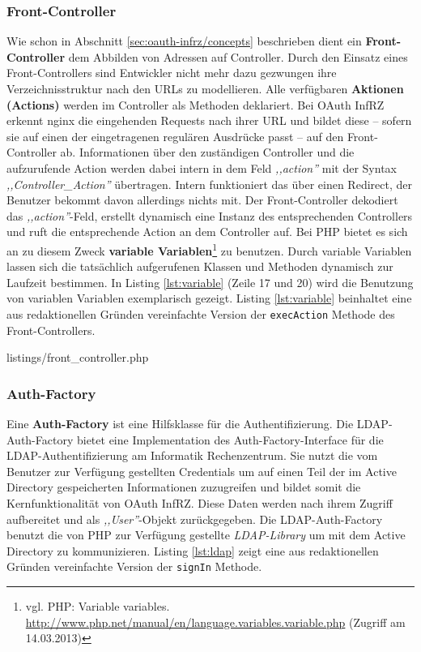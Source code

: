 \documentclass[12pt,a4paper,pointednumbers,abstracton]{scrartcl}
\newcommand{\code}[1]{\small\lstinline[style=InlinePHP]!#1!\normalsize}
\begin{document}
\subsubsection{Front-Controller}

Wie schon in Abschnitt \ref{sec:oauth-infrz/concepts} beschrieben dient ein \textbf{Front-Controller} dem Abbilden von Adressen auf Controller.
Durch den Einsatz eines Front-Controllers sind Entwickler nicht mehr dazu gezwungen ihre Verzeichnisstruktur nach den URLs zu modellieren.
Alle verfügbaren \textbf{Aktionen (Actions)} werden im Controller als Methoden deklariert.
Bei OAuth InfRZ erkennt nginx die eingehenden Requests nach ihrer URL und bildet diese -- sofern sie auf einen der eingetragenen regulären Ausdrücke passt -- auf den Front-Controller ab.
Informationen über den zuständigen Controller und die aufzurufende Action werden dabei intern in dem Feld \emph{,,action''} mit der Syntax \emph{,,Controller\_Action''} übertragen.
Intern funktioniert das über einen Redirect, der Benutzer bekommt davon allerdings nichts mit.
Der Front-Controller dekodiert das \emph{,,action''}-Feld, erstellt dynamisch eine Instanz des entsprechenden Controllers und ruft die entsprechende Action an dem Controller auf.
Bei PHP bietet es sich an zu diesem Zweck \textbf{variable Variablen}\footnote{vgl. PHP: Variable variables. \url{http://www.php.net/manual/en/language.variables.variable.php} (Zugriff am 14.03.2013)} zu benutzen.
Durch variable Variablen lassen sich die tatsächlich aufgerufenen Klassen und Methoden dynamisch zur Laufzeit bestimmen.
In Listing \ref{lst:variable} (Zeile 17 und 20) wird die Benutzung von variablen Variablen exemplarisch gezeigt.
Listing \ref{lst:variable} beinhaltet eine aus redaktionellen Gründen vereinfachte Version der \code{execAction} Methode des Front-Controllers.

\begin{minipage}{\textwidth}
	
	{listings/front_controller.php}
\end{minipage}

\subsubsection{Auth-Factory}

Eine \textbf{Auth-Factory} ist eine Hilfsklasse für die Authentifizierung.
Die LDAP-Auth-Factory bietet eine Implementation des Auth-Factory-Interface für die LDAP-Authentifizierung am Informatik Rechenzentrum.
Sie nutzt die vom Benutzer zur Verfügung gestellten Credentials um auf einen Teil der im Active Directory gespeicherten Informationen zuzugreifen und bildet somit die Kernfunktionalität von OAuth InfRZ.
Diese Daten werden nach ihrem Zugriff aufbereitet und als \emph{,,User''}-Objekt zurückgegeben.
Die LDAP-Auth-Factory benutzt die von PHP zur Verfügung gestellte \emph{LDAP-Library} um mit dem Active Directory zu kommunizieren.
Listing \ref{lst:ldap} zeigt eine aus redaktionellen Gründen vereinfachte Version der \code{signIn} Methode.
\end{document}
